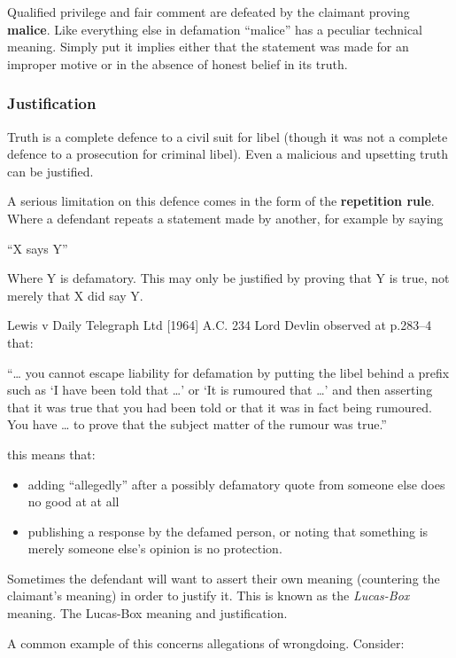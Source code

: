 \documentclass[]{article}
\begin{document}
{{Qualified privilege and fair comment are defeated by the claimant
proving }}{\textbf{malice}}{{. Like everything else in defamation
``malice'' has a peculiar technical meaning. Simply put it implies
either that the statement was made for an improper motive or in the
absence of honest belief in its truth.}}

\subsubsection{Justification}

Truth is a complete defence to a civil suit for libel (though it was not
a complete defence to a prosecution for criminal libel). Even a
malicious and upsetting truth can be justified.

{{A serious limitation on this defence comes in the form of the
}}{\textbf{repetition rule}}{{. Where a defendant repeats a statement
made by another, for example by saying }}

``X says Y''

Where Y is defamatory. This may only be justified by proving that Y is
true, not merely that X did say Y.

Lewis v Daily Telegraph Ltd {[}1964{]} A.C. 234 Lord Devlin observed at
p.283--4 that:

``\ldots{} you cannot escape liability for defamation by putting the
libel behind a prefix such as `I have been told that \ldots{}' or `It is
rumoured that \ldots{}' and then asserting that it was true that you had
been told or that it was in fact being rumoured. You have \ldots{} to
prove that the subject matter of the rumour was true.''

this means that:

\begin{itemize}
\item
  adding ``allegedly'' after a possibly defamatory quote from someone
  else does no good at at all
\item
  publishing a response by the defamed person, or noting that something
  is merely someone else's opinion is no protection.
\end{itemize}

{{Sometimes the defendant will want to assert their own meaning
(countering the claimant's meaning) in order to justify it. This is
known as the }}\emph{{Lucas-Box}}{{ meaning. The Lucas-Box meaning and
justification. }}

A common example of this concerns allegations of wrongdoing. Consider:
\end{document}
